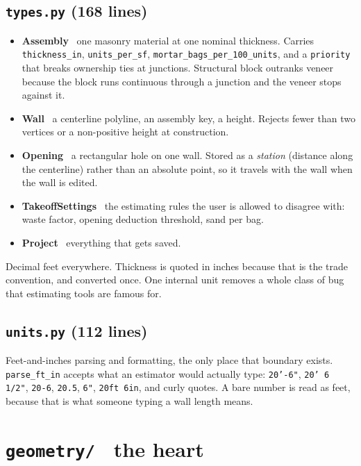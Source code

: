 \documentclass[11pt,letterpaper]{article}
\newcommand{\code}[1]{\texttt{\small #1}}
\newcommand{\term}[1]{\textbf{#1}}
\begin{document}
\subsection{\texttt{types.py} (168 lines)}

\begin{itemize}
  \item \term{Assembly} \textendash\ one masonry material at one nominal
    thickness. Carries \code{thickness\_in}, \code{units\_per\_sf},
    \code{mortar\_bags\_per\_100\_units}, and a \code{priority} that breaks
    ownership ties at junctions. Structural block outranks veneer because
    the block runs continuous through a junction and the veneer stops
    against it.
  \item \term{Wall} \textendash\ a centerline polyline, an assembly key, a
    height. Rejects fewer than two vertices or a non-positive height at
    construction.
  \item \term{Opening} \textendash\ a rectangular hole on one wall. Stored
    as a \emph{station} (distance along the centerline) rather than an
    absolute point, so it travels with the wall when the wall is edited.
  \item \term{TakeoffSettings} \textendash\ the estimating rules the user is
    allowed to disagree with: waste factor, opening deduction threshold,
    sand per bag.
  \item \term{Project} \textendash\ everything that gets saved.
\end{itemize}

\begin{keypoint}
Decimal feet everywhere. Thickness is quoted in inches because that is the
trade convention, and converted once. One internal unit removes a whole
class of bug that estimating tools are famous for.
\end{keypoint}

\subsection{\texttt{units.py} (112 lines)}

Feet-and-inches parsing and formatting, the only place that boundary exists.
\code{parse\_ft\_in} accepts what an estimator would actually type:
\code{20'-6"}, \code{20' 6 1/2"}, \code{20-6}, \code{20.5}, \code{6"},
\code{20ft 6in}, and curly quotes. A bare number is read as feet, because
that is what someone typing a wall length means.

\section{\texttt{geometry/} \textendash\ the heart}
\end{document}
